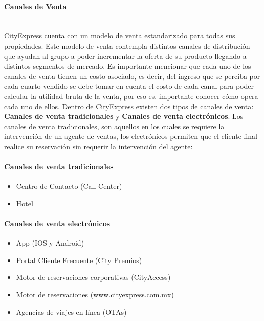 \documentclass{article}\usepackage[]{graphicx}\usepackage[]{color}
\begin{document}
\paragraph{Canales de Venta}
~\\
CityExpress cuenta con un modelo de venta estandarizado para todas sus propiedades. Este modelo de venta contempla distintos canales de distribución que ayudan al grupo a poder incrementar la oferta de su producto llegando a distintos segmentos de mercado.
Es importante mencionar que cada uno de los canales de venta tienen un costo asociado, es decir, del ingreso que se perciba por cada cuarto vendido se debe tomar en cuenta el costo de cada canal para poder calcular la utilidad bruta de la venta, por eso es. importante conocer cómo opera cada uno de ellos.
Dentro de CityExpress existen dos tipos de canales de venta: \textbf{Canales de venta tradicionales} y \textbf{Canales de venta electrónicos}. Los canales de venta tradicionales, son aquellos en los cuales se requiere la intervención de un agente de ventas, los electrónicos permiten que el cliente final realice su reservación sin requerir la intervención del agente:
\paragraph{\textbf{Canales de venta tradicionales}}
\begin{itemize}[noitemsep]
\item Centro de Contacto (Call Center)
\item Hotel
\end{itemize}
\paragraph{\textbf{Canales de venta electrónicos}}
\begin{itemize}[noitemsep]
\item App (IOS y Android)
\item Portal Cliente Frecuente (City Premios)
\item Motor de reservaciones corporativas (CityAccess)
\item Motor de reservaciones (www.cityexpress.com.mx)
\item Agencias de viajes en línea (OTAs)
\end{itemize}
\end{document}
